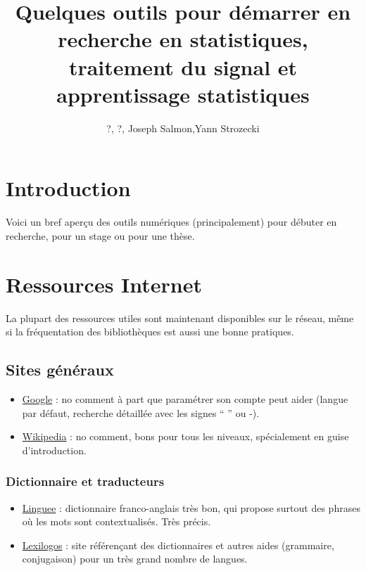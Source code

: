 \documentclass[a4paper,10pt]{article}
\title{Quelques outils pour démarrer en recherche en statistiques, traitement du signal
et apprentissage statistiques}
\author{?, ?, Joseph Salmon,Yann Strozecki}
\date {}
\begin{document}
\sloppy
\maketitle
\tableofcontents 


\newpage
\printnomenclature

\section{Introduction}

Voici un bref aperçu des outils numériques (principalement) pour débuter 
en recherche, pour un stage ou pour une thèse.



\section{Ressources Internet}


La plupart des ressources utiles sont maintenant disponibles sur le réseau,
même si la fréquentation des bibliothèques est aussi une bonne pratiques.


\subsection{Sites généraux}
\begin{itemize}
 \item \href{www.google.com}{Google} : 
no comment à part que paramétrer son compte
peut aider (langue par défaut, recherche détaillée avec les signes `` '' ou -).

\item \href{http://wikipedia.org/}{Wikipedia} : no comment, 
bons pour tous les niveaux, spécialement en guise d'introduction.

\end{itemize}




\subsubsection{Dictionnaire et traducteurs}

\begin{itemize}
\item \href{http://www.linguee.com/}{Linguee} : dictionnaire franco-anglais très bon, qui propose 
surtout des phrases où les mots sont contextualisés. Très précis.
\item \href{http://www.lexilogos.com/}{Lexilogos} : site référençant des dictionnaires et autres
aides (grammaire, conjugaison) pour un très grand nombre de langues. 
\end{itemize}
\end{document}

